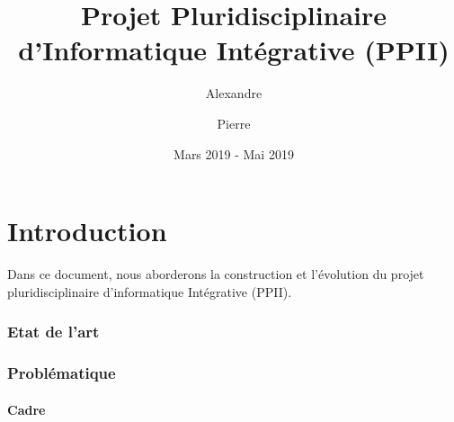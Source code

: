 \documentclass{article}
\title{Projet Pluridisciplinaire d'Informatique Intégrative (PPII)}
\author{
    Alexandre \sc{Cesari}
    \and
    Pierre \sc{Bouillon}
}
\date{Mars 2019 - Mai 2019}
\begin{document}
\maketitle

\newpage


\tableofcontents{}

\newpage


\part*{Introduction}

Dans ce document, nous aborderons la construction et l'évolution du projet pluridisciplinaire d'informatique Intégrative (PPII).

\newpage


\section{Etat de l'art}


\newpage


\section{Problématique}

\subsection{Cadre}
\end{document}
